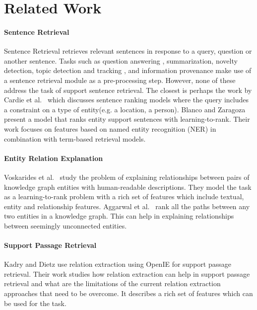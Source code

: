 \documentclass[sigconf,anonymous,review]{acmart}
\begin{document}
\section{Related Work}
\label{sec:related work}
\paragraph{\textbf{Sentence Retrieval}}
Sentence Retrieval retrieves relevant sentences in response to a query, question or another sentence. Tasks such as question answering \cite{cardie2000examining}, summarization, novelty detection, topic detection and tracking \cite{stokes2001first}, and information provenance make use of a sentence retrieval module as a pre-processing step. However, none of these address the task of support sentence retrieval. The closest is perhaps the work by Cardie et al.\ \cite{cardie2000examining} which discusses sentence ranking models where the query includes a constraint on a type of entity(e.g. a location, a person). 
Blanco and Zaragoza \cite{blanco2010finding} present a model that ranks entity support sentences with learning-to-rank. Their work focuses on features based on named entity recognition (NER) in combination with term-based retrieval models. 
\paragraph{\textbf{Entity Relation Explanation}}
Voskarides et al.\ \cite{voskarides2015learning} study the problem of explaining relationships between pairs of knowledge graph entities with human-readable descriptions. They model the task as a learning-to-rank problem with a rich set of features which include textual, entity and relationship features. Aggarwal et al.\ \cite{aggarwal2016connecting} rank all the paths between any two entities in a knowledge graph. This can help in explaining relationships between seemingly unconnected entities. 

\paragraph{\textbf{Support Passage Retrieval}}
Kadry and Dietz \cite{kadry2017open} use relation extraction using OpenIE for support passage retrieval. Their work studies how relation extraction can help in support passage retrieval and what are the limitations of the current relation extraction approaches that need to be overcome. It describes a rich set of features which can be used for the task.  
\end{document}
